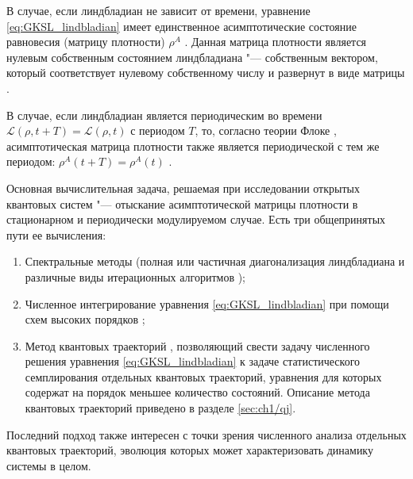 В случае, если линдбладиан не зависит от времени, уравнение \cref{eq:GKSL_lindbladian} имеет единственное асимптотические состояние равновесия (матрицу плотности) \(\rho^A\) \cite{book2007}.
Данная матрица плотности является нулевым собственным состоянием линдбладиана "--- собственным вектором, который соответствует нулевому собственному числу и развернут в виде матрицы \cite{Albert2014, Albert2016}.

В случае, если линдбладиан является периодическим во времени \(\mathcal{L}(\rho,t + T) = \mathcal{L}(\rho,t)\) с периодом \(T\), то, согласно теории Флоке \cite{Meyer1977}, асимптотическая матрица плотности также является периодической с тем же периодом: \(\rho^A(t + T) = \rho^A(t)\) \cite{Hartmann2017}. 

Основная вычислительная задача, решаемая при исследовании открытых квантовых систем "--- отыскание асимптотической матрицы плотности в стационарном и периодически модулируемом случае. 
Есть три общепринятых пути ее вычисления:
\begin{enumerate}[beginpenalty=10000] %
	\item Спектральные методы (полная или частичная диагонализация линдбладиана и различные виды итерационных алгоритмов \cite{Nation2015, eigenweb, Hernandez2005});
	\item Численное интегрирование уравнения \cref{eq:GKSL_lindbladian} при помощи схем высоких порядков \cite{Lambert1991};
	\item Метод квантовых траекторий \cite{Dum1992, Molmer1993, Plenio1998, Daley2014}, позволяющий свести задачу численного решения уравнения \cref{eq:GKSL_lindbladian} к задаче статистического семплирования отдельных квантовых траекторий, уравнения для которых содержат на порядок меньшее количество состояний.
	Описание метода квантовых траекторий приведено в разделе \cref{sec:ch1/qj}.
\end{enumerate}
Последний подход также интересен с точки зрения численного анализа отдельных квантовых траекторий, эволюция которых может характеризовать динамику системы в целом. 


